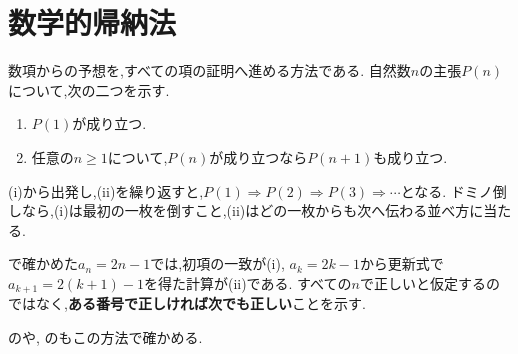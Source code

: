 
\section{数学的帰納法}\label{節：数学的帰納法}
  数項からの予想を,すべての項の証明へ進める方法である.
  自然数$n$の主張$P(n)$について,次の二つを示す.
  \begin{enumerate}[label=(\roman*),parsep=3pt]
    \item $P(1)$が成り立つ.
    \item 任意の$n\ge1$について,$P(n)$が成り立つなら$P(n+1)$も成り立つ.
  \end{enumerate}
  (i)から出発し,(ii)を繰り返すと,$P(1)\Rightarrow P(2)\Rightarrow P(3)\Rightarrow\cdots$となる.
  ドミノ倒しなら,(i)は最初の一枚を倒すこと,(ii)はどの一枚からも次へ伝わる並べ方に当たる.

  で確かめた$a_n=2n-1$では,初項の一致が(i),
  $a_k=2k-1$から更新式で$a_{k+1}=2(k+1)-1$を得た計算が(ii)である.
  すべての$n$で正しいと仮定するのではなく,\textbf{ある番号で正しければ次でも正しい}ことを示す.

  のや,
  のもこの方法で確かめる.
